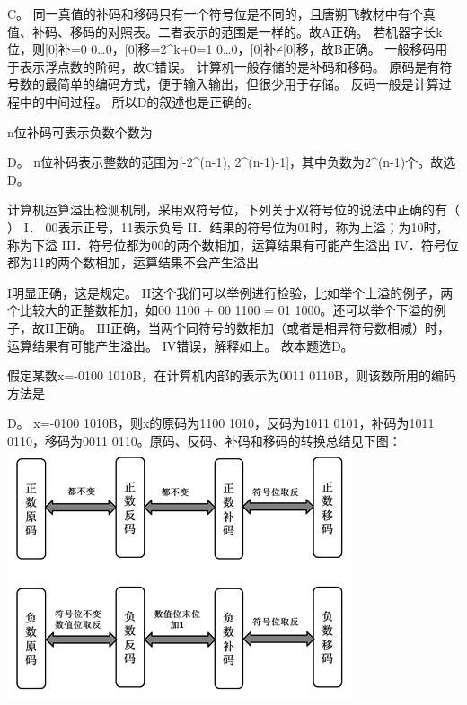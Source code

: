 \par{}
\begin{solution}C。
同一真值的补码和移码只有一个符号位是不同的，且唐朔飞教材中有个真值、补码、移码的对照表。二者表示的范围是一样的。故A正确。
若机器字长k位，则{[}0{]}补=0 0\ldots{}0，{[}0{]}移=2\^{}k+0=1
0\ldots{}0，{[}0{]}补≠{[}0{]}移，故B正确。
一般移码用于表示浮点数的阶码，故C错误。 计算机一般存储的是补码和移码。
原码是有符号数的最简单的编码方式，便于输入输出，但很少用于存储。
反码一般是计算过程中的中间过程。 所以D的叙述也是正确的。
\end{solution}
\question n位补码可表示负数个数为
\par\fourch{}{}{}{\textcolor{red}{}}
\begin{solution}D。 n位补码表示整数的范围为{[}-2\^{}(n-1),
2\^{}(n-1)-1{]}，其中负数为2\^{}(n-1)个。故选D。
\end{solution}
\question 计算机运算溢出检测机制，采用双符号位，下列关于双符号位的说法中正确的有（
） I． 00表示正号，11表示负号
II．结果的符号位为01时，称为上溢；为10时，称为下溢
III．符号位都为00的两个数相加，运算结果有可能产生溢出
IV．符号位都为11的两个数相加，运算结果不会产生溢出
\par{}
\begin{solution}I明显正确，这是规定。
II这个我们可以举例进行检验，比如举个上溢的例子，两个比较大的正整数相加，如00
1100 + 00 1100 = 01 1000。还可以举个下溢的例子，故II正确。
III正确，当两个同符号的数相加（或者是相异符号数相减）时，运算结果有可能产生溢出。
IV错误，解释如上。 故本题选D。
\end{solution}
\question 假定某数x=-0100 1010B，在计算机内部的表示为0011
0110B，则该数所用的编码方法是
\par{}
\begin{solution}D。 x=-0100 1010B，则x的原码为1100 1010，反码为1011 0101，补码为1011
0110，移码为0011 0110。原码、反码、补码和移码的转换总结见下图：
\includegraphics[width=4.00000in,height=2.88542in]{computerassets/ff87fd74ad5ca4f839ef07dc5dff3a95.jpeg}
\end{solution}
